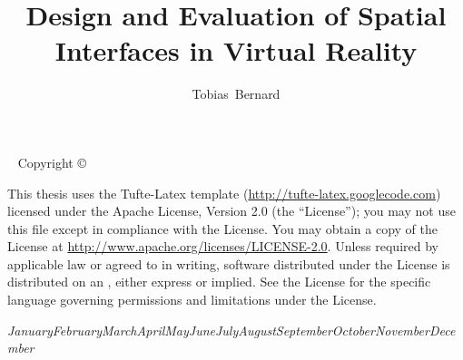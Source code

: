 \documentclass[nobib]{tufte-book} %
\title{Design and Evaluation of Spatial Interfaces in Virtual Reality} %
\author[Tobias Bernard]{Tobias\ Bernard} %
\newcommand{\monthyear}{\ifcase\month\or January\or February\or March\or April\or May\or June\or July\or August\or September\or October\or November\or December\fi\space\number\year} %
\begin{document}

%
%



\maketitlepage %


\newpage
\begin{fullwidth}
~\vfill
\thispagestyle{empty}
\setlength{\parindent}{0pt}
\setlength{\parskip}{\baselineskip}
Copyright \copyright\ \the\year\ \thanklessauthor

\par This thesis uses the Tufte-Latex template (\url{http://tufte-latex.googlecode.com}) licensed under the Apache License, Version 2.0 (the ``License''); you may not use this file except in compliance with the License. You may obtain a copy of the License at \url{http://www.apache.org/licenses/LICENSE-2.0}. Unless required by applicable law or agreed to in writing, software distributed under the License is distributed on an , either express or implied. See the License for the specific language governing permissions and limitations under the License.

\par\textit{\monthyear}
\end{fullwidth}


\tableofcontents %


\mainmatter


\end{document}
